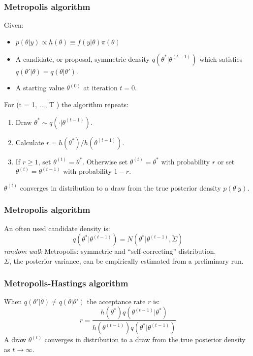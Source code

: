 \documentclass{beamer}
\newcommand{\1}{\ensuremath{\mathbf{1}}}
\begin{document}
%
%
%
\begin{frame}\frametitle{Metropolis algorithm}
	Given:
	\begin{itemize}
		\item $p(\theta|y) \propto h(\theta) \equiv f(y|\theta) \pi(\theta)$
		\item A candidate, or proposal, symmetric density $q(\theta^*|\theta^{(t-1)})$ which satisfies $q(\theta'|\theta) = q(\theta|\theta')$.
		\item A starting value $\theta^{(0)}$ at iteration $t = 0$.
	\end{itemize}
	For (t = 1, ..., T ) the algorithm repeats:
	\begin{enumerate}
		\item Draw $\theta^* \sim q(\cdot|\theta^{(t-1)})$.
		\item Calculate $r = h(\theta^*)/h(\theta^{(t-1)})$.
		\item If $r \geq 1$, set $\theta^{(t)} = \theta^*$. Otherwise set $\theta^{(t)} = \theta^*$ with probability $r$ or set $\theta^{(t)} = \theta^{(t-1)}$ with probability $1-r$.
	\end{enumerate}
	$\theta^{(t)}$ converges in distribution to a draw from the true posterior density $p(\theta|y)$.
\end{frame}
%
%
%
\begin{frame}\frametitle{Metropolis algorithm}
	An often used candidate density is:
	\begin{equation}
		q(\theta^*|\theta^{(t-1)}) = N(\theta^*|\theta^{(t-1)},\tilde{\Sigma})
	\end{equation}
	\emph{random walk} Metropolis: symmetric and ``self-correcting'' distribution.\\[2ex]
	$\tilde{\Sigma}$, the posterior variance, can be empirically estimated from a preliminary run.
\end{frame}
%
%
%
\begin{frame}\frametitle{Metropolis-Hastings algorithm}
	When $q(\theta'|\theta) \neq q(\theta|\theta')$ the acceptance rate $r$ is:
	\begin{equation}
		r = \frac{h(\theta^*)q(\theta^{(t-1)}|\theta^*)}{h(\theta^{(t-1)})q(\theta^*|\theta^{(t-1)})}
	\end{equation}
	A draw $\theta^{(t)}$ converges in distribution to a draw from the true posterior density as $t \to \infty$.
\end{frame}
\end{document}
